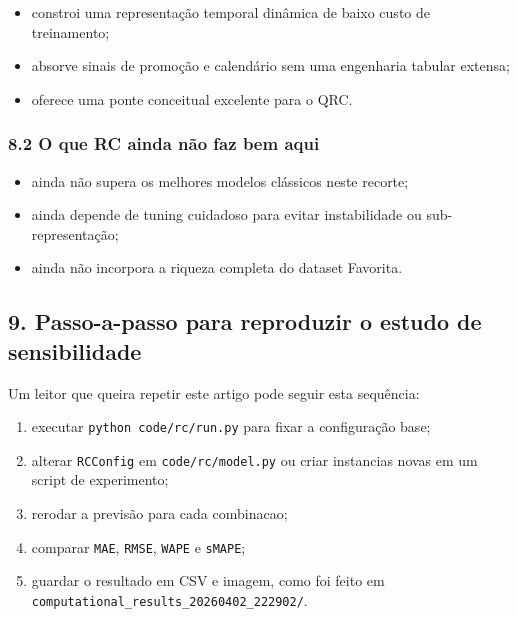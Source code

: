 \documentclass[12pt]{article}
\providecommand{\tightlist}{%
  \setlength{\itemsep}{0pt}\setlength{\parskip}{0pt}}
\begin{document}
\begin{itemize}
\tightlist
\item
  constroi uma representação temporal dinâmica de baixo custo de treinamento;
\item
  absorve sinais de promoção e calendário sem uma engenharia tabular extensa;
\item
  oferece uma ponte conceitual excelente para o QRC.
\end{itemize}

\subsubsection{8.2 O que RC ainda não faz bem aqui}\label{82-o-que-rc-ainda-nuxe3o-faz-bem-aqui}

\begin{itemize}
\tightlist
\item
  ainda não supera os melhores modelos clássicos neste recorte;
\item
  ainda depende de tuning cuidadoso para evitar instabilidade ou sub-representação;
\item
  ainda não incorpora a riqueza completa do dataset Favorita.
\end{itemize}

\subsection{9. Passo-a-passo para reproduzir o estudo de sensibilidade}\label{9-passo-a-passo-para-reproduzir-o-estudo-de-sensibilidade}

Um leitor que queira repetir este artigo pode seguir esta sequência:

\begin{enumerate}
\def\labelenumi{\arabic{enumi}.}
\tightlist
\item
  executar \texttt{python\ code/rc/run.py} para fixar a configuração base;
\item
  alterar \texttt{RCConfig} em \texttt{code/rc/model.py} ou criar instancias novas em um script de experimento;
\item
  rerodar a previsão para cada combinacao;
\item
  comparar \texttt{MAE}, \texttt{RMSE}, \texttt{WAPE} e \texttt{sMAPE};
\item
  guardar o resultado em CSV e imagem, como foi feito em \texttt{computational\_results\_20260402\_222902/}.
\end{enumerate}
\end{document}
